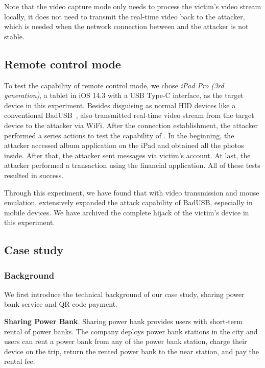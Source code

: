 Note that the video capture mode only needs to
process the victim's video stream locally, it does not need to transmit the real-time video back to the attacker, which is needed when the network connection between \tool and the attacker is not stable. 

\subsection{Remote control mode}

To test the capability of remote control mode, we chose \textit{iPad Pro (3rd
	generation)}, a tablet in iOS 14.3 with a USB Type-C interface, as the target
device in this experiment.  Besides disguising as normal HID devices like a
conventional BadUSB~\cite{badusb}, \tool also transmitted real-time video
stream from the target device to the attacker via WiFi.  After the connection
establishment, the attacker performed a series actions to test the capability of
\tool. In the beginning, the attacker accessed album application on the iPad and
obtained all the photos inside. After that, the attacker sent messages via victim's
account. At last, the attacker performed a transaction using the
financial application. All of these tests resulted in success.

Through this experiment, we have found that with video transmission and mouse
emulation, \tool extensively expanded the attack capability of BadUSB,
especially in mobile devices. We have archived the complete hijack of the victim's
device in this experiment.

\subsection{Case study}
\label{subsec:case_study}
\subsubsection{Background}

We first introduce the technical background of our case study, sharing power
bank service and QR code payment.

\textbf{Sharing Power Bank}.  Sharing power bank provides users with short-term
rental of power banks.  The company deploys power bank stations in the city and
users can rent a power bank from any of the power bank station, charge their
device on the trip, return the rented power bank to the near station, and pay
the rental fee.

